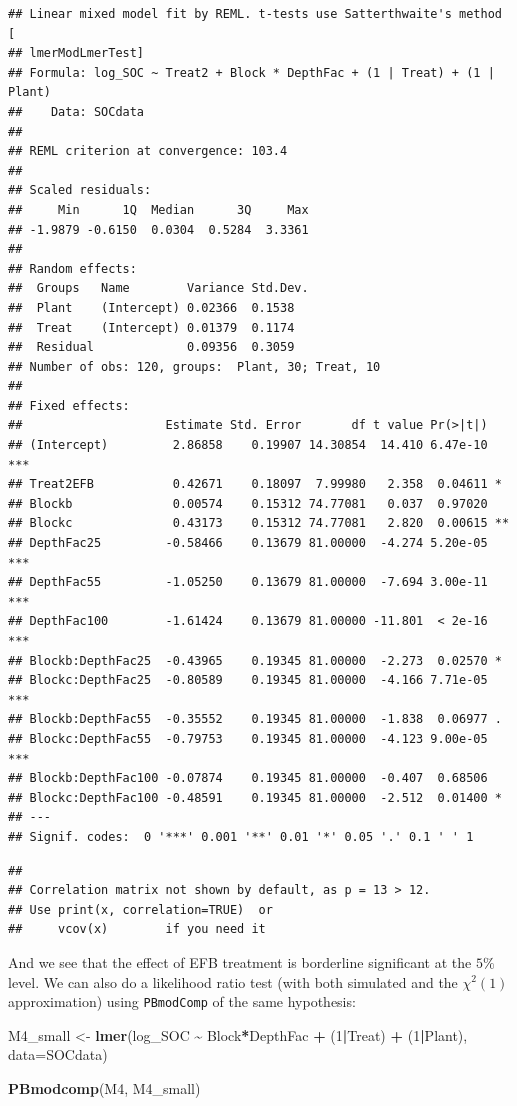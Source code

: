 \documentclass[
]{article}
\newenvironment{Shaded}{\begin{snugshade}}{\end{snugshade}}
\newcommand{\AttributeTok}[1]{\textcolor[rgb]{0.13,0.29,0.53}{#1}}
\newcommand{\DecValTok}[1]{\textcolor[rgb]{0.00,0.00,0.81}{#1}}
\newcommand{\FunctionTok}[1]{\textcolor[rgb]{0.13,0.29,0.53}{\textbf{#1}}}
\newcommand{\NormalTok}[1]{#1}
\newcommand{\OtherTok}[1]{\textcolor[rgb]{0.56,0.35,0.01}{#1}}
\newcommand{\SpecialCharTok}[1]{\textcolor[rgb]{0.81,0.36,0.00}{\textbf{#1}}}
\begin{document}
\begin{verbatim}
## Linear mixed model fit by REML. t-tests use Satterthwaite's method [
## lmerModLmerTest]
## Formula: log_SOC ~ Treat2 + Block * DepthFac + (1 | Treat) + (1 | Plant)
##    Data: SOCdata
## 
## REML criterion at convergence: 103.4
## 
## Scaled residuals: 
##     Min      1Q  Median      3Q     Max 
## -1.9879 -0.6150  0.0304  0.5284  3.3361 
## 
## Random effects:
##  Groups   Name        Variance Std.Dev.
##  Plant    (Intercept) 0.02366  0.1538  
##  Treat    (Intercept) 0.01379  0.1174  
##  Residual             0.09356  0.3059  
## Number of obs: 120, groups:  Plant, 30; Treat, 10
## 
## Fixed effects:
##                    Estimate Std. Error       df t value Pr(>|t|)    
## (Intercept)         2.86858    0.19907 14.30854  14.410 6.47e-10 ***
## Treat2EFB           0.42671    0.18097  7.99980   2.358  0.04611 *  
## Blockb              0.00574    0.15312 74.77081   0.037  0.97020    
## Blockc              0.43173    0.15312 74.77081   2.820  0.00615 ** 
## DepthFac25         -0.58466    0.13679 81.00000  -4.274 5.20e-05 ***
## DepthFac55         -1.05250    0.13679 81.00000  -7.694 3.00e-11 ***
## DepthFac100        -1.61424    0.13679 81.00000 -11.801  < 2e-16 ***
## Blockb:DepthFac25  -0.43965    0.19345 81.00000  -2.273  0.02570 *  
## Blockc:DepthFac25  -0.80589    0.19345 81.00000  -4.166 7.71e-05 ***
## Blockb:DepthFac55  -0.35552    0.19345 81.00000  -1.838  0.06977 .  
## Blockc:DepthFac55  -0.79753    0.19345 81.00000  -4.123 9.00e-05 ***
## Blockb:DepthFac100 -0.07874    0.19345 81.00000  -0.407  0.68506    
## Blockc:DepthFac100 -0.48591    0.19345 81.00000  -2.512  0.01400 *  
## ---
## Signif. codes:  0 '***' 0.001 '**' 0.01 '*' 0.05 '.' 0.1 ' ' 1
\end{verbatim}

\begin{verbatim}
## 
## Correlation matrix not shown by default, as p = 13 > 12.
## Use print(x, correlation=TRUE)  or
##     vcov(x)        if you need it
\end{verbatim}

And we see that the effect of EFB treatment is borderline significant at
the \(5\%\) level. We can also do a likelihood ratio test (with both
simulated and the \(\chi^2(1)\) approximation) using \texttt{PBmodComp}
of the same hypothesis:

\begin{Shaded}
\begin{Highlighting}[]
\NormalTok{M4\_small }\OtherTok{\textless{}{-}} \FunctionTok{lmer}\NormalTok{(log\_SOC }\SpecialCharTok{\textasciitilde{}}\NormalTok{ Block}\SpecialCharTok{*}\NormalTok{DepthFac }\SpecialCharTok{+}\NormalTok{ (}\DecValTok{1}\SpecialCharTok{|}\NormalTok{Treat) }\SpecialCharTok{+}\NormalTok{ (}\DecValTok{1}\SpecialCharTok{|}\NormalTok{Plant),}
\AttributeTok{data=}\NormalTok{SOCdata)}

\FunctionTok{PBmodcomp}\NormalTok{(M4, M4\_small)}
\end{Highlighting}
\end{Shaded}
\end{document}
